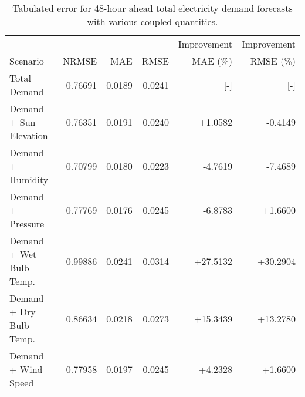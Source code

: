 \begin{table*}[h]
  \centering
  \caption{Tabulated error for 48-hour ahead total electricity demand
  forecasts with various coupled quantities.}
  \label{tab:demand48}
  \begin{tabular}{l r r r r r}
    \hline
    & & & & Improvement & Improvement \\
    Scenario &NRMSE & MAE & RMSE & MAE (\%) & RMSE (\%)\\
    \hline
    Total Demand & 0.76691 & 0.0189 & 0.0241 & [-] & [-] \\
    Demand + Sun Elevation & 0.76351 & 0.0191 & 0.0240 & +1.0582 & -0.4149 \\
    Demand + Humidity & 0.70799 & 0.0180 & 0.0223 & -4.7619 & -7.4689 \\
    Demand + Pressure & 0.77769 & 0.0176 & 0.0245 & -6.8783 & +1.6600 \\
    Demand + Wet Bulb Temp. & 0.99886 & 0.0241 & 0.0314 & +27.5132 & +30.2904
    \\
    Demand + Dry Bulb Temp. & 0.86634 & 0.0218 & 0.0273 & +15.3439 & +13.2780
    \\
    Demand + Wind Speed & 0.77958 & 0.0197 & 0.0245 & +4.2328 & +1.6600 \\
    \hline
  \end{tabular}
\end{table*}
\FloatBarrier
